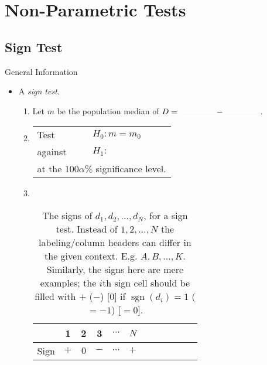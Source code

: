 \chapter{Non-Parametric Tests}
\section{Sign Test}
\begin{stbox}{General Information}
  \begin{itemize}
    \item A \emph{sign test}.
    \begin{enumerate}
      \item Let \(m\) be the population median of \(D=\rule{1.5cm}{0.01mm}-\rule{1.5cm}{0.01mm}\).
      \item 
      \begin{tabular}{|ll|}
        \hline
        Test & \(H_0\colon m=m_0\)\\
        against &\(H_1\colon\) 
        \begin{enumerate*}[itemjoin={\quad}]
          \item \(m<m_0\),
          \item \(m\neq m_0\),\quad or
          \item \(m>m_0\),
        \end{enumerate*}\\
        \multicolumn{2}{|l|}{at the \(100\alpha\%\) significance level.}\\
        \hline
      \end{tabular}
      \item ~
      \begin{table}[H]
        \centering
        \begin{tabular}{|Sc|Sc|Sc|Sc|Sc|Sc|}
           & 1 & 2 & 3 & \(\cdots\) & \(N\)\\
          \hline 
          Sign & \(+\) & \(0\) & \(-\) & \(\cdots\) & \(+\)\\
          \hline
        \end{tabular}
        \caption{The signs of \(d_1,d_2,\dots,d_N\), for a sign test. Instead of \(1,2,\dots,N\) the labeling/column headers can differ in the given context. E.g. \(A,B,\dots,K\). Similarly, the signs here are mere examples; the \(i\)th sign cell should be filled with \(+\) (\(-\)) [0] if \(\operatorname{sgn}(d_i)=1\) (\(=-1\)) [\(=0\)].}
        \label{table:sign-test-working-table}
      \end{table}

\end{enumerate}
\end{itemize}
\end{stbox}
